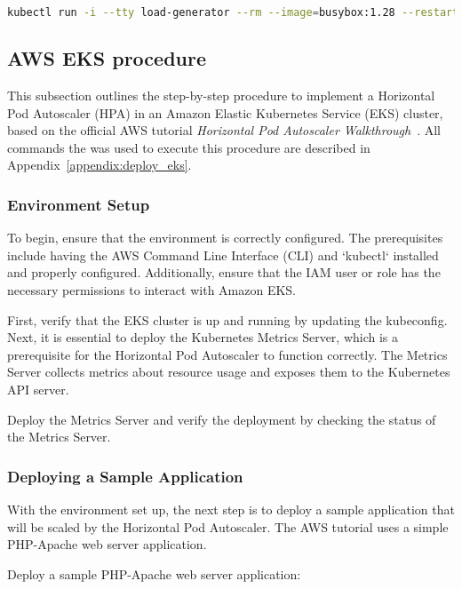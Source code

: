 \begin{lstlisting}[language=bash, label={lst:kubectl_load},caption={Simulating the load}]
  kubectl run -i --tty load-generator --rm --image=busybox:1.28 --restart=Never -- /bin/sh -c "while sleep 0.01; do wget -q -O- http://php-apache; done"
\end{lstlisting}

\subsection{AWS EKS procedure}

This subsection outlines the step-by-step procedure to implement a Horizontal Pod Autoscaler (HPA) in an Amazon Elastic Kubernetes Service (EKS) cluster, based on the official AWS tutorial \textit{Horizontal Pod Autoscaler Walkthrough}~\cite{AwsHorizontalPodAutoescaler}. All commands the was used to execute this procedure are described in Appendix~\ref{appendix:deploy_eks}.

\subsubsection{Environment Setup}

To begin, ensure that the environment is correctly configured. The prerequisites include having the AWS Command Line Interface (CLI) and `kubectl` installed and properly configured. Additionally, ensure that the IAM user or role has the necessary permissions to interact with Amazon EKS.

First, verify that the EKS cluster is up and running by updating the kubeconfig. Next, it is essential to deploy the Kubernetes Metrics Server, which is a prerequisite for the Horizontal Pod Autoscaler to function correctly. The Metrics Server collects metrics about resource usage and exposes them to the Kubernetes API server.

Deploy the Metrics Server and verify the deployment by checking the status of the Metrics Server.

\subsubsection{Deploying a Sample Application}

With the environment set up, the next step is to deploy a sample application that will be scaled by the Horizontal Pod Autoscaler. The AWS tutorial uses a simple PHP-Apache web server application.

Deploy a sample PHP-Apache web server application:

